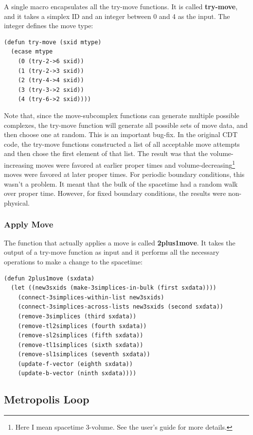 \message{ !name(programmers_guide.tex)}\documentclass[12pt]{article}
\begin{document}
A single macro encapsulates all the try-move functions. It is called
\textbf{try-move}, and it takes a simplex ID and an integer between 0
and 4 as the input. The integer defines the move type:
\begin{lstlisting}
(defun try-move (sxid mtype)
  (ecase mtype
    (0 (try-2->6 sxid))
    (1 (try-2->3 sxid))
    (2 (try-4->4 sxid))
    (3 (try-3->2 sxid))
    (4 (try-6->2 sxid))))
\end{lstlisting}

Note that, since the move-subcomplex functions can generate multiple
possible complexes, the try-move function will generate all possible
sets of move data, and then choose one at random. This is an important
bug-fix. In the original CDT code, the try-move functions constructed
a list of all acceptable move attempts and then chose the first
element of that list. The result was that the volume-increasing moves
were favored at earlier proper times and
volume-decreasing\footnote{Here I mean spacetime 3-volume. See the
  user's guide for more details.} moves were favored at later proper
times. For periodic boundary conditions, this wasn't a problem. It
meant that the bulk of the spacetime had a random walk over proper
time. However, for fixed boundary conditions, the results were
non-physical.

\subsubsection{Apply Move}

The function that actually applies a move is called
\textbf{2plus1move}. It takes the output of a try-move function as
input and it performs all the necessary operations to make a change to
the spacetime:
\begin{lstlisting}
(defun 2plus1move (sxdata)
  (let ((new3sxids (make-3simplices-in-bulk (first sxdata))))
    (connect-3simplices-within-list new3sxids)
    (connect-3simplices-across-lists new3sxids (second sxdata))
    (remove-3simplices (third sxdata))
    (remove-tl2simplices (fourth sxdata))
    (remove-sl2simplices (fifth sxdata))
    (remove-tl1simplices (sixth sxdata))
    (remove-sl1simplices (seventh sxdata))
    (update-f-vector (eighth sxdata))
    (update-b-vector (ninth sxdata))))
\end{lstlisting}

\subsection{Metropolis Loop}
\label{s:f:metropolis:loop}
\end{document}

